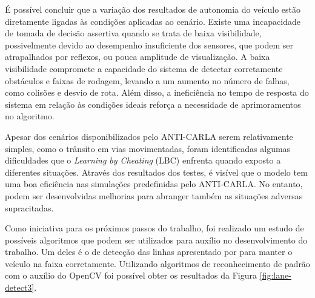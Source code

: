 \documentclass[a4paper,12pt,Times]{article}
\begin{document}

É possível concluir que a variação dos resultados de autonomia do veículo estão diretamente ligadas às condições aplicadas ao cenário. Existe uma incapacidade de tomada de decisão assertiva quando se trata de baixa visibilidade, possivelmente devido ao desempenho insuficiente dos sensores, que podem ser atrapalhados por reflexos, ou pouca amplitude de visualização. A baixa visibilidade compromete a capacidade do sistema de detectar corretamente obstáculos e faixas de rodagem, levando a um aumento no número de falhas, como colisões e desvio de rota. Além disso, a ineficiência no tempo de resposta do sistema em relação às condições ideais reforça a necessidade de aprimoramentos no algoritmo.

Apesar dos cenários disponibilizados pelo ANTI-CARLA serem relativamente simples, como o trânsito em vias movimentadas, foram identificadas algumas dificuldades que o \textit{Learning by Cheating} (LBC) enfrenta quando exposto a diferentes situações. 
Através dos resultados dos testes, é visível que o modelo tem uma boa eficiência nas simulações predefinidas pelo ANTI-CARLA. No entanto, podem ser desenvolvidas melhorias para abranger também as situações adversas supracitadas. 


Como iniciativa para os próximos passos do trabalho, foi realizado um estudo de possíveis algoritmos que podem ser utilizados para auxílio no desenvolvimento do trabalho. Um deles é o de detecção das linhas apresentado por \cite{kim2024carla} para manter o veículo na faixa corretamente. Utilizando algoritmos de reconhecimento de padrão com o auxílio do OpenCV foi possível obter os resultados da Figura \ref{fig:lane-detect3}. 
\end{document}
